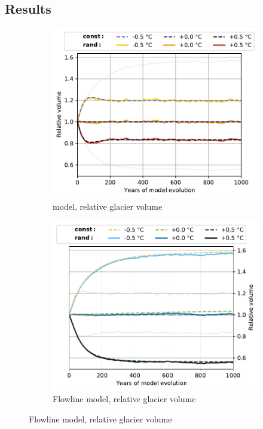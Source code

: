 
    \subsection{Results} %
    \label{sub:results_regional_run}

        \begin{figure}[t!]
          \centering
          \begin{subfigure}[b]{0.48\textwidth}
            \caption{\Vas{} model, relative glacier volume}
            \label{fig:histalp_commitment:volume_norm_const}
            \centering
            \includegraphics[width=\textwidth]{../plots/final_plots/time_series/histalp_commitment/volume_norm_vas.pdf}
          \end{subfigure}
          \hfill
          \begin{subfigure}[b]{0.48\textwidth}
            \caption{Flowline model, relative glacier volume}
            \label{fig:histalp_commitment:volume_norm_random}
            \centering
            \includegraphics[width=\textwidth]{../plots/final_plots/time_series/histalp_commitment/volume_norm_fl.pdf}

\end{subfigure}
\end{figure}
